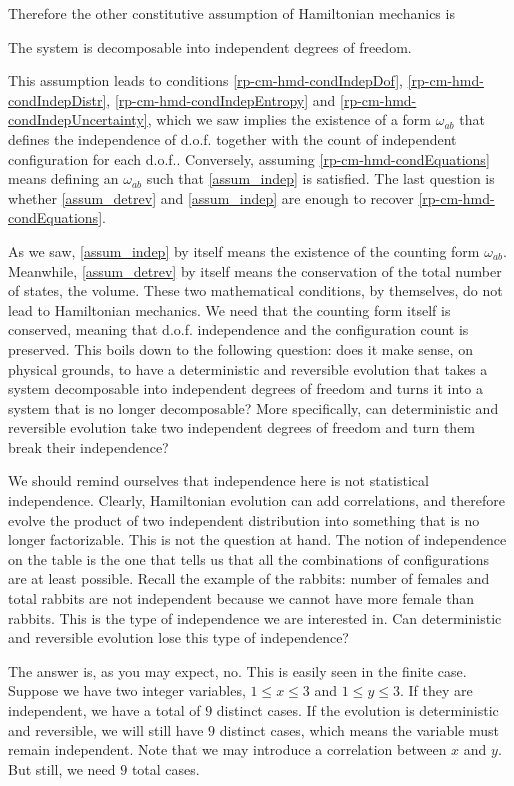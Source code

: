 Therefore the other constitutive assumption of Hamiltonian mechanics is
\renewcommand{\theassump}{IND}
\begin{assump}[Independent d.o.f.]\label{assum_indep}
	The system is decomposable into independent degrees of freedom.
\end{assump}
\renewcommand{\theassump}{\Roman{assump}}
This assumption leads to conditions \ref{rp-cm-hmd-condIndepDof}, \ref{rp-cm-hmd-condIndepDistr}, \ref{rp-cm-hmd-condIndepEntropy} and
\ref{rp-cm-hmd-condIndepUncertainty}, which we saw implies the existence of a form $\omega_{ab}$ that defines the independence of d.o.f. together with the count of independent configuration for each d.o.f.. Conversely, assuming \ref{rp-cm-hmd-condEquations} means defining an $\omega_{ab}$ such that \ref{assum_indep} is satisfied. The last question is whether \ref{assum_detrev} and \ref{assum_indep} are enough to recover \ref{rp-cm-hmd-condEquations}.

As we saw, \ref{assum_indep} by itself means the existence of the counting form $\omega_{ab}$. Meanwhile, \ref{assum_detrev} by itself means the conservation of the total number of states, the volume. These two mathematical conditions, by themselves, do not lead to Hamiltonian mechanics. We need that the counting form itself is conserved, meaning that d.o.f. independence and the configuration count is preserved. This boils down to the following question: does it make sense, on physical grounds, to have a deterministic and reversible evolution that takes a system decomposable into independent degrees of freedom and turns it into a system that is no longer decomposable? More specifically, can deterministic and reversible evolution take two independent degrees of freedom and turn them break their independence?

We should remind ourselves that independence here is not statistical independence. Clearly, Hamiltonian evolution can add correlations, and therefore evolve the product of two independent distribution into something that is no longer factorizable. This is not the question at hand. The notion of independence on the table is the one that tells us that all the combinations of configurations are at least possible. Recall the example of the rabbits: number of females and total rabbits are not independent because we cannot have more female than rabbits. This is the type of independence we are interested in. Can deterministic and reversible evolution lose this type of independence?

The answer is, as you may expect, no. This is easily seen in the finite case. Suppose we have two integer variables, $1 \leq x \leq 3$ and $1 \leq y \leq 3$. If they are independent, we have a total of $9$ distinct cases. If the evolution is deterministic and reversible, we will still have $9$ distinct cases, which means the variable must remain independent. Note that we may introduce a correlation between $x$ and $y$. But still, we need $9$ total cases.

